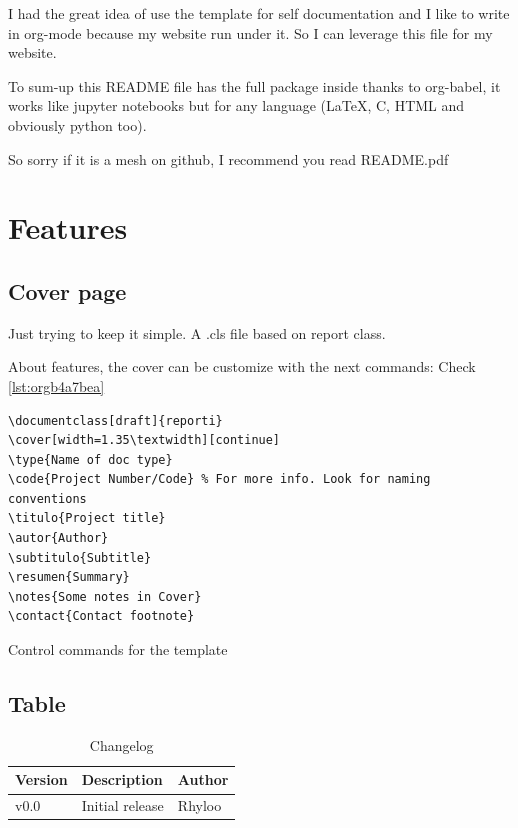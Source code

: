 \documentclass{reporti}
\begin{document}
\begin{tcolorbox}[colback=yellow!5!white,colframe=red,title=Warning, fonttitle=\Large\bfseries,
  fontupper=\noindent,boxsep=2pt,enhanced,left=10pt,top=5pt, bottom=5pt,right=10pt]
  
I had the great idea of use the template for self documentation and I like to write in org-mode because my website run under it. So I can leverage this file for my website.

To sum‐up this README file has the full package inside thanks to org-babel, it works like jupyter notebooks but for any language (LaTeX, C, HTML and obviously python too).

So sorry if it is a mesh on github, I recommend you read README.pdf
\end{tcolorbox}

\section{Features}
\label{sec:orgac07e6b}
\subsection{Cover page}
\label{sec:org269a8ec}
Just trying to keep it simple. A .cls file based on report class.

About features, the cover can be customize with the next commands: Check \ref{lst:orgb4a7bea}
\begin{listing}[htbp]
\begin{verbatim}
\documentclass[draft]{reporti}
\cover[width=1.35\textwidth][continue]
\type{Name of doc type}
\code{Project Number/Code} % For more info. Look for naming conventions
\titulo{Project title} 
\autor{Author}
\subtitulo{Subtitle}
\resumen{Summary}
\notes{Some notes in Cover}
\contact{Contact footnote}
\end{verbatim}
\caption{\label{lst:orgb4a7bea}Control commands for the template}
\end{listing}

\subsection{Table}
\label{sec:orgbb7bc5f}
\begin{table}[htbp]
\caption{Changelog}
\centering
\begin{tabular}{lll}
\hline
Version & Description & Author\\[0pt]
\hline
v0.0 & Initial release & Rhyloo\\[0pt]
\hline
\end{tabular}
\end{table}
\end{document}
